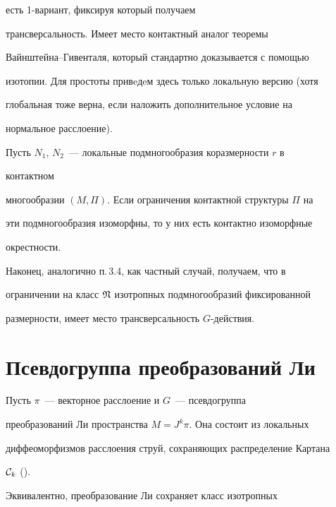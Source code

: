 есть 1-вариант, фиксируя который получаем


трансверсальность. Имеет место контактный аналог теоремы


Вайнштейна--Гивенталя, который стандартно доказывается с помощью


изотопии. Для простоты привeдeм здесь только локальную версию (хотя


глобальная тоже верна, если наложить дополнительное условие на


нормальное расслоение).





\begin{thm}


Пусть $N_1$, $N_2$~--- локальные подмногообразия коразмерности $r$ в


контактном


многообразии $(M,\Pi)$. Если ограничения контактной структуры $\Pi$ на


эти подмногообразия изоморфны, то у них есть контактно изоморфные


окрестности. 


\end{thm}





Наконец, аналогично п.\,3.4, как частный случай, получаем, что в


ограничении на класс $\frak{N}$ изотропных подмногообразий фиксированной


размерности, имеет место трансверсальность $G$-действия.








\section{Псевдогруппа преобразований Ли}\label{S4}





Пусть $\pi$~--- векторное расслоение и $G$~--- псевдогруппа


преобразований Ли пространства $M=J^k\pi$. Она состоит из локальных


диффеоморфизмов расслоения струй, сохраняющих распределение Картана


${\cal C}_k$ (\cite{KLV}).


Эквивалентно, преобразование Ли сохраняет класс изотропных


